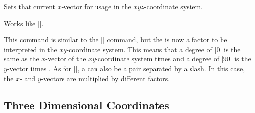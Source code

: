 \begin{command}{\pgfsetxvec{}}
    Sets that current $x$-vector for usage in the $xyz$-coordinate system.
    \example
\begin{codeexample}[]
\end{codeexample}
\end{command}

\begin{command}{\pgfsetyvec{}}
    Works like |\pgfsetxvec|.
\end{command}

\begin{command}{\pgfpointpolarxy{}}
    This command is similar to the |\pgfpointpolar| command, but the
     is now a factor to be interpreted in the $xy$-coordinate
    system. This means that a degree of |0| is the same as the $x$-vector of
    the $xy$-coordinate  system times  and a degree of |90| is the
    $y$-vector times . As for |\pgfpointpolar|, a 
    can also be a pair separated by a slash. In this case, the $x$- and
    $y$-vectors are multiplied by different factors.
\begin{codeexample}[]
\end{codeexample}
\end{command}


\subsection{Three Dimensional Coordinates}


